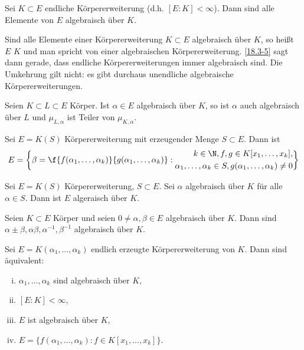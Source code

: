 \begin{kor} \label{18.3-5}
	Sei $K \subset E$ endliche Körpererweiterung (d.h. $[E : K] < \infty$).
	Dann sind alle Elemente von $E$ algebraisch über $K$.
\end{kor}

Sind alle Elemente einer Körpererweiterung $K \subset E$ algebraisch über $K$, so heißt $E$  $K$ und man spricht von einer algebraischen Körpererweiterung.
\ref{18.3-5} sagt dann gerade, dass endliche Körpererweiterungen immer algebraisch sind.
Die Umkehrung gilt nicht: es gibt durchaus unendliche algebraische Körpererweiterungen.

\begin{lem} \label{18.3-6}
	Seien $K \subset L \subset E$ Körper.
	Ist $\alpha \in E$ algebraisch über $K$, so ist $\alpha$ auch algebraisch über $L$ und $\mu_{L, \alpha}$ ist Teiler von $\mu_{K, \alpha}$.
\end{lem}

\begin{lem} \label{18.3-7}
	Sei $E = K(S)$ Körpererweiterung mit erzeugender Menge $S \subset E$.
	Dann ist
	\[
		E = \bigg\{ \beta = \f{f(\alpha_1, \dotsc, \alpha_k)}{g(\alpha_1, \dotsc, \alpha_k)} : \begin{aligned} k \in \N, f,g \in K[x_1, \dotsc, x_k], \\\alpha_1, \dotsc, \alpha_k \in S, g(\alpha_1, \dotsc, \alpha_k) \neq 0 \end{aligned} \bigg\}
	\]
\end{lem}

\begin{st} \label{18.3-8}
	Sei $E = K(S)$ Körpererweiterung, $S \subset E$.
	Sei $\alpha$ algebraisch über $K$ für alle $\alpha \in S$.
	Dann ist $E$ algeraisch über $K$.
\end{st}

\begin{kor} \label{18.3-9}
	Seien $K \subset E$ Körper und seien $0 \neq \alpha, \beta \in E$ algebraisch über $K$.
	Dann sind $\alpha \pm \beta, \alpha \beta, \alpha^{-1}, \beta^{-1}$ algebraisch über $K$.
\end{kor}

\begin{kor} \label{18.3-10}
	Sei $E = K(\alpha_1, \dotsc, \alpha_k)$ endlich erzeugte Körpererweiterung von $K$.
	Dann sind äquivalent:
	\begin{enumerate}[i)]
		\item
			$\alpha_1, \dotsc, \alpha_k$ sind algebraisch über $K$,
		\item
			$[E : K] < \infty$,
		\item
			$E$ ist algebraisch über $K$,
		\item
			$E = \{ f(\alpha_1, \dotsc, \alpha_k) : f \in K[x_1, \dotsc, x_k] \}$.
	\end{enumerate}
\end{kor}


